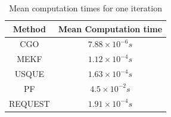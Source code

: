 \begin{table}[!h]
\centering
\begin{tabular}{|c|c|}
\hline
Method & Mean Computation time \\
\hline
\hline
CGO & $7.88 \times 10^{-6} s$\rule[-2pt]{0pt}{10pt}\\
 \hline
MEKF & $1.12\times 10^{-4} s$\rule[-2pt]{0pt}{10pt}\\
 \hline
 USQUE & $1.63\times 10^{-4} s $\rule[-2pt]{0pt}{10pt}\\
 \hline
PF & $4.5\times 10^{-2} s$\rule[-2pt]{0pt}{10pt}\\
 \hline
REQUEST& $1.91\times 10^{-4} s$ \rule[-2pt]{0pt}{10pt} \\
 \hline
\end{tabular}
\caption{Mean computation times for one iteration}
\label{mean_time}
\end{table}



